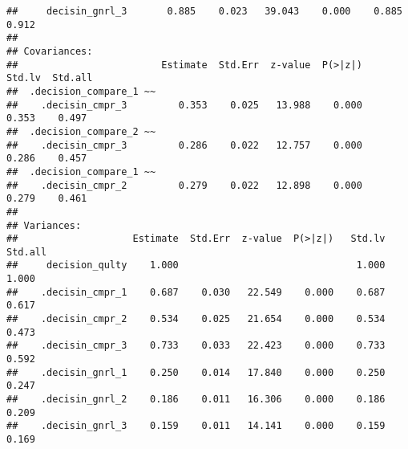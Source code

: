 \documentclass[]{article}
\begin{document}
\begin{verbatim}
##     decisin_gnrl_3       0.885    0.023   39.043    0.000    0.885    0.912
## 
## Covariances:
##                         Estimate  Std.Err  z-value  P(>|z|)   Std.lv  Std.all
##  .decision_compare_1 ~~                                                      
##    .decisin_cmpr_3         0.353    0.025   13.988    0.000    0.353    0.497
##  .decision_compare_2 ~~                                                      
##    .decisin_cmpr_3         0.286    0.022   12.757    0.000    0.286    0.457
##  .decision_compare_1 ~~                                                      
##    .decisin_cmpr_2         0.279    0.022   12.898    0.000    0.279    0.461
## 
## Variances:
##                    Estimate  Std.Err  z-value  P(>|z|)   Std.lv  Std.all
##     decision_qulty    1.000                               1.000    1.000
##    .decisin_cmpr_1    0.687    0.030   22.549    0.000    0.687    0.617
##    .decisin_cmpr_2    0.534    0.025   21.654    0.000    0.534    0.473
##    .decisin_cmpr_3    0.733    0.033   22.423    0.000    0.733    0.592
##    .decisin_gnrl_1    0.250    0.014   17.840    0.000    0.250    0.247
##    .decisin_gnrl_2    0.186    0.011   16.306    0.000    0.186    0.209
##    .decisin_gnrl_3    0.159    0.011   14.141    0.000    0.159    0.169
\end{verbatim}
\end{document}
